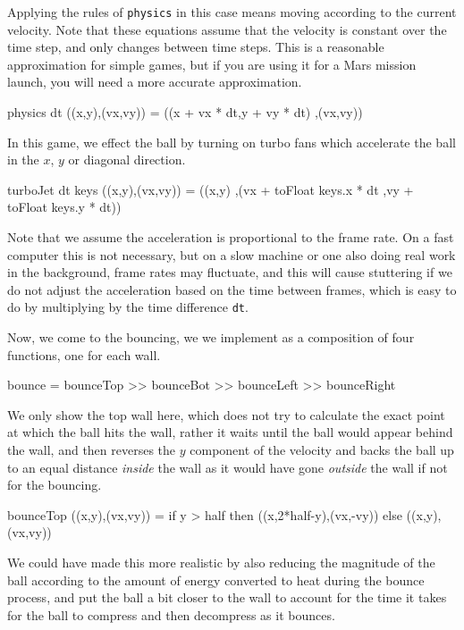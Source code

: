 \documentclass[12pt]{amsbook}
\begin{document}
Applying the rules of \texttt{physics} in this case means moving according to the current velocity.
Note that these equations assume that the velocity is constant over the time step,
and only changes between time steps.
This is a reasonable approximation for simple games,
but if you are using it for a Mars mission launch, you will need a more accurate approximation.
\begin{code}
physics dt ((x,y),(vx,vy)) = ((x + vx * dt,y + vy * dt)
                             ,(vx,vy))
\end{code}
In this game, we effect the ball by turning on turbo fans which accelerate the ball in the $x$, $y$ or diagonal direction.
\begin{code}
turboJet dt keys ((x,y),(vx,vy)) = ((x,y)
                                   ,(vx + toFloat keys.x * dt
                                    ,vy + toFloat keys.y * dt))
\end{code}
Note that we assume the acceleration is proportional to the frame rate.
On a fast computer this is not necessary, but on a slow machine or one also doing real work in the background, frame rates may fluctuate, and this will cause stuttering if we do not adjust the acceleration based on the time between frames,
which is easy to do by multiplying by the time difference \texttt{dt}.

Now, we come to the bouncing, we we implement as a composition of four functions,
one for each wall.
\begin{code}
bounce = bounceTop >> bounceBot >> bounceLeft >> bounceRight
\end{code}
We only show the top wall here, which does not try to calculate the exact
point at which the ball hits the wall,
rather it waits until the ball would appear behind the wall,
and then reverses the $y$ component of the velocity and 
backs the ball up to an equal distance \emph{inside} the wall as 
it would have gone \emph{outside} the wall if not for the bouncing.
\begin{code}
bounceTop ((x,y),(vx,vy)) = if y > half 
                            then ((x,2*half-y),(vx,-vy))
                            else ((x,y),(vx,vy))
\end{code}
We could have made this more realistic by also reducing the magnitude 
of the ball according to the amount of energy converted to heat during the bounce process, and put the ball a bit closer to the wall to account for the time it takes for the ball to compress and then decompress as it bounces.
\end{document}
